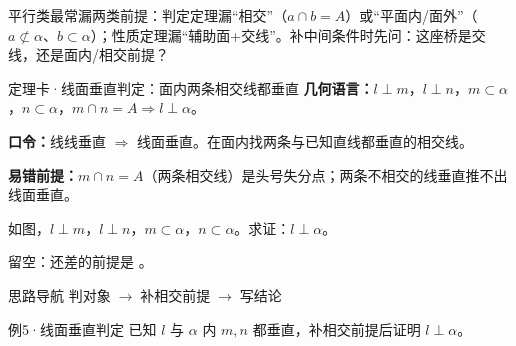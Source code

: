 \documentclass{exam-zh}
\begin{document}
\begin{eduMistakeBox}
平行类最常漏两类前提：判定定理漏“相交”（$a\cap b=A$）或“平面内/面外”（$a\not\subset\alpha$、$b\subset\alpha$）；性质定理漏“辅助面+交线”。补中间条件时先问：这座桥是交线，还是面内/相交前提？\end{eduMistakeBox}



\clearpage
{}


\begin{eduSolutionBox}{定理卡·线面垂直判定：面内两条相交线都垂直}
  \begingroup
  \setlength{\parskip}{2.5mm}
\textbf{几何语言：}$l\perp m$，$l\perp n$，$m\subset\alpha$，$n\subset\alpha$，$m\cap n=A\Rightarrow l\perp\alpha$。\par
\textbf{口令：}线线垂直 $\Rightarrow$ 线面垂直。在面内找两条与已知直线都垂直的相交线。\par
\textbf{易错前提：}$m\cap n=A$（两条相交线）是头号失分点；两条不相交的线垂直推不出线面垂直。\par
  \endgroup
\end{eduSolutionBox}




\begin{eduProblemBlock}[例5·线面垂直判定]
如图，$l\perp m$，$l\perp n$，$m\subset\alpha$，$n\subset\alpha$。求证：$l\perp\alpha$。
\par\noindent 留空：还差的前提是 \underline{\hspace{20mm}}。

\end{eduProblemBlock}





\begin{eduAuxItem}{思路导航}
判对象$\;\to\;$补相交前提$\;\to\;$写结论\end{eduAuxItem}




\begin{eduSubQuestionItem}{例5·线面垂直判定}
已知 $l$ 与 $\alpha$ 内 $m,n$ 都垂直，补相交前提后证明 $l\perp\alpha$。\end{eduSubQuestionItem}
\end{document}
